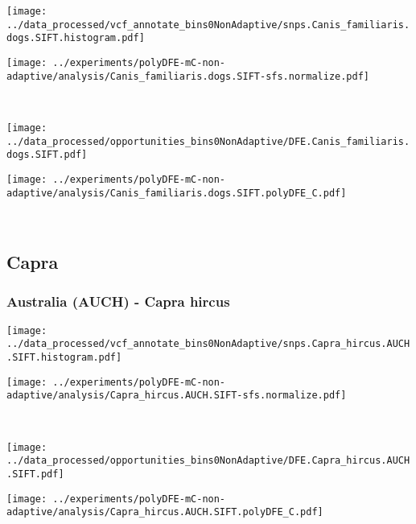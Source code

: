 \begin{minipage}{0.49\linewidth}
    \texttt{[image: ../data\_processed/vcf\_annotate\_bins0NonAdaptive/snps.Canis\_familiaris.dogs.SIFT.histogram.pdf]}
\end{minipage}
\begin{minipage}{0.49\linewidth}
    \texttt{[image: ../experiments/polyDFE-mC-non-adaptive/analysis/Canis\_familiaris.dogs.SIFT-sfs.normalize.pdf]}
\end{minipage}
\\
\begin{minipage}{0.49\linewidth}
    \texttt{[image: ../data\_processed/opportunities\_bins0NonAdaptive/DFE.Canis\_familiaris.dogs.SIFT.pdf]}
\end{minipage}
\begin{minipage}{0.49\linewidth}
    \texttt{[image: ../experiments/polyDFE-mC-non-adaptive/analysis/Canis\_familiaris.dogs.SIFT.polyDFE\_C.pdf]}
\end{minipage}
\\

\subsection{Capra}

\subsubsection{Australia (AUCH) - Capra hircus}

\begin{minipage}{0.49\linewidth}
    \texttt{[image: ../data\_processed/vcf\_annotate\_bins0NonAdaptive/snps.Capra\_hircus.AUCH.SIFT.histogram.pdf]}
\end{minipage}
\begin{minipage}{0.49\linewidth}
    \texttt{[image: ../experiments/polyDFE-mC-non-adaptive/analysis/Capra\_hircus.AUCH.SIFT-sfs.normalize.pdf]}
\end{minipage}
\\
\begin{minipage}{0.49\linewidth}
    \texttt{[image: ../data\_processed/opportunities\_bins0NonAdaptive/DFE.Capra\_hircus.AUCH.SIFT.pdf]}
\end{minipage}
\begin{minipage}{0.49\linewidth}
    \texttt{[image: ../experiments/polyDFE-mC-non-adaptive/analysis/Capra\_hircus.AUCH.SIFT.polyDFE\_C.pdf]}
\end{minipage}
\\


